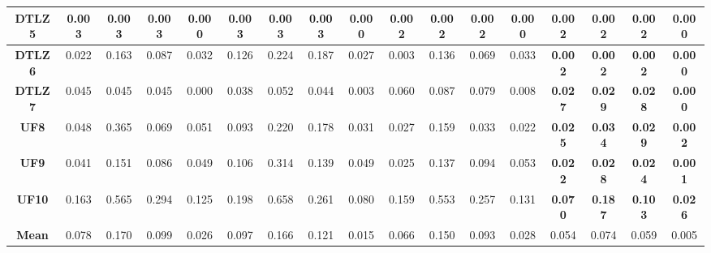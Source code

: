 \begin{table*}[t]
\begin{scriptsize}
\begin{tabular}{cc|c|c|c|c|c|c|c|c|c|c|c|c|c|c|c}
\multicolumn{1}{c|}{\textbf{DTLZ5}} & 0.003        & 0.003        & 0.003         & 0.000        & 0.003        & 0.003        & 0.003         & 0.000        & 0.002          & 0.002          & 0.002          & 0.000          & \textbf{0.002} & \textbf{0.002} & \textbf{0.002} & \textbf{0.000} \\ \hline
\multicolumn{1}{c|}{\textbf{DTLZ6}} & 0.022        & 0.163        & 0.087         & 0.032        & 0.126        & 0.224        & 0.187         & 0.027        & 0.003          & 0.136          & 0.069          & 0.033          & \textbf{0.002} & \textbf{0.002} & \textbf{0.002} & \textbf{0.000} \\ \hline
\multicolumn{1}{c|}{\textbf{DTLZ7}} & 0.045        & 0.045        & 0.045         & 0.000        & 0.038        & 0.052        & 0.044         & 0.003        & 0.060          & 0.087          & 0.079          & 0.008          & \textbf{0.027} & \textbf{0.029} & \textbf{0.028} & \textbf{0.000} \\ \hline
\multicolumn{1}{c|}{\textbf{UF8}}   & 0.048        & 0.365        & 0.069         & 0.051        & 0.093        & 0.220        & 0.178         & 0.031        & 0.027          & 0.159          & 0.033          & 0.022          & \textbf{0.025} & \textbf{0.034} & \textbf{0.029} & \textbf{0.002} \\ \hline
\multicolumn{1}{c|}{\textbf{UF9}}   & 0.041        & 0.151        & 0.086         & 0.049        & 0.106        & 0.314        & 0.139         & 0.049        & 0.025          & 0.137          & 0.094          & 0.053          & \textbf{0.022} & \textbf{0.028} & \textbf{0.024} & \textbf{0.001} \\ \hline
\multicolumn{1}{c|}{\textbf{UF10}}  & 0.163        & 0.565        & 0.294         & 0.125        & 0.198        & 0.658        & 0.261         & 0.080        & 0.159          & 0.553          & 0.257          & 0.131          & \textbf{0.070} & \textbf{0.187} & \textbf{0.103} & \textbf{0.026} \\ \hline
\multicolumn{1}{c|}{\textbf{Mean}}  & 0.078        & 0.170        & 0.099         & 0.026        & 0.097        & 0.166        & 0.121         & 0.015        & 0.066          & 0.150          & 0.093          & 0.028          & 0.054          & 0.074          & 0.059          & 0.005          \\ \hline
\end{tabular}%
\end{scriptsize}
\end{table*}

